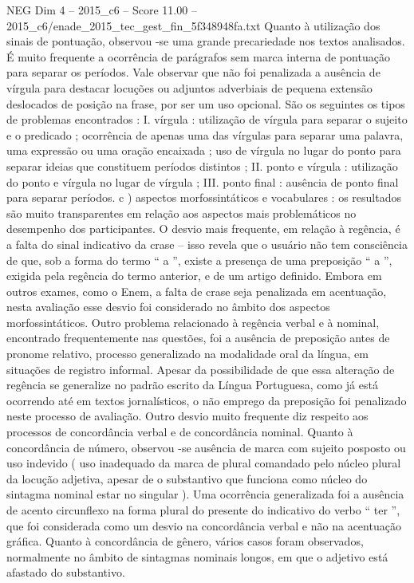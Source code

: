 \begin{textsample}{NEG Dim 4 – 2015\_c6 – Score 11.00 – 2015\_c6/enade\_2015\_tec\_gest\_fin\_5f348948fa.txt}
Quanto à utilização dos sinais de pontuação, observou -se uma grande precariedade nos textos analisados.
É muito frequente a ocorrência de parágrafos sem marca interna de pontuação para separar os períodos.
Vale observar que não foi penalizada a ausência de vírgula para destacar locuções ou adjuntos adverbiais de pequena extensão deslocados de posição na frase, por ser um uso opcional.
São os seguintes os tipos de problemas encontrados : I. vírgula : utilização de vírgula para separar o sujeito e o predicado ; ocorrência de apenas uma das vírgulas para separar uma palavra, uma expressão ou uma oração encaixada ; uso de vírgula no lugar do ponto para separar ideias que constituem períodos distintos ; II. ponto e vírgula : utilização do ponto e vírgula no lugar de vírgula ; III. ponto final : ausência de ponto final para separar períodos. c ) aspectos morfossintáticos e vocabulares : os resultados são muito transparentes em relação aos aspectos mais problemáticos no desempenho dos participantes.
O desvio mais frequente, em relação à regência, é a falta do sinal indicativo da crase – isso revela que o usuário não tem consciência de que, sob a forma do termo “ a ”, existe a presença de uma preposição “ a ”, exigida pela regência do termo anterior, e de um artigo definido.
Embora em outros exames, como o Enem, a falta de crase seja penalizada em acentuação, nesta avaliação esse desvio foi considerado no âmbito dos aspectos morfossintáticos.
Outro problema relacionado à regência verbal e à nominal, encontrado frequentemente nas questões, foi a ausência de preposição antes de pronome relativo, processo generalizado na modalidade oral da língua, em situações de registro informal.
Apesar da possibilidade de que essa alteração de regência se generalize no padrão escrito da Língua Portuguesa, como já está ocorrendo até em textos jornalísticos, o não emprego da preposição foi penalizado neste processo de avaliação.
Outro desvio muito frequente diz respeito aos processos de concordância verbal e de concordância nominal.
Quanto à concordância de número, observou -se ausência de marca com sujeito posposto ou uso indevido ( uso inadequado da marca de plural comandado pelo núcleo plural da locução adjetiva, apesar de o substantivo que funciona como núcleo do sintagma nominal estar no singular ).
Uma ocorrência generalizada foi a ausência de acento circunflexo na forma plural do presente do indicativo do verbo “ ter ”, que foi considerada como um desvio na concordância verbal e não na acentuação gráfica.
Quanto à concordância de gênero, vários casos foram observados, normalmente no âmbito de sintagmas nominais longos, em que o adjetivo está afastado do substantivo.

\end{textsample}
